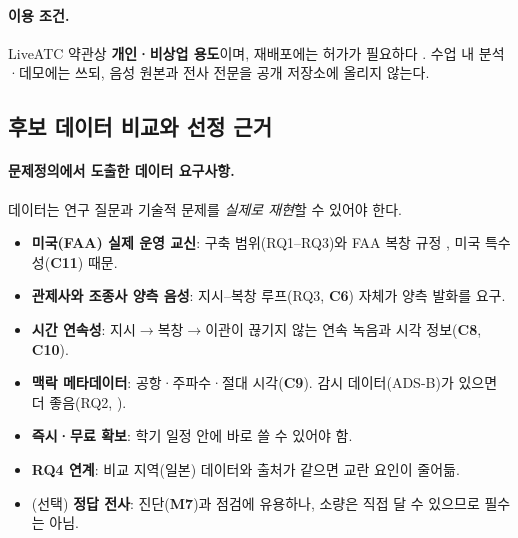 \documentclass[10pt,a4paper]{article}
\newcommand{\ch}[1]{\textbf{\textcolor{red!60!black}{#1}}}
\newcommand{\md}[1]{\textbf{\textcolor{blue!60!black}{#1}}}
\begin{document}
\paragraph{이용 조건.} LiveATC 약관상 \textbf{개인·비상업 용도}이며, 재배포에는 허가가 필요하다 \cite{hfliveatc}. 수업 내 분석·데모에는 쓰되, 음성 원본과 전사 전문을 공개 저장소에 올리지 않는다.

\subsection{후보 데이터 비교와 선정 근거}\label{sec:datacmp}
\paragraph{문제정의에서 도출한 데이터 요구사항.} 데이터는 연구 질문과 기술적 문제를 \emph{실제로 재현}할 수 있어야 한다.
\begin{itemize}
\item[\textbf{R1}] \textbf{미국(FAA) 실제 운영 교신}: 구축 범위(RQ1--RQ3)와 FAA 복창 규정 \cite{faa7110}, 미국 특수성(\ch{C11}) 때문.
\item[\textbf{R2}] \textbf{관제사와 조종사 양측 음성}: 지시--복창 루프(RQ3, \ch{C6}) 자체가 양측 발화를 요구.
\item[\textbf{R3}] \textbf{시간 연속성}: 지시$\to$복창$\to$이관이 끊기지 않는 연속 녹음과 시각 정보(\ch{C8}, \ch{C10}).
\item[\textbf{R4}] \textbf{맥락 메타데이터}: 공항·주파수·절대 시각(\ch{C9}). 감시 데이터(ADS-B)가 있으면 더 좋음(RQ2, \cite{nigmatulina2022}).
\item[\textbf{R5}] \textbf{즉시·무료 확보}: 학기 일정 안에 바로 쓸 수 있어야 함.
\item[\textbf{R6}] \textbf{RQ4 연계}: 비교 지역(일본) 데이터와 출처가 같으면 교란 요인이 줄어듦.
\item[\textbf{R7}] (선택) \textbf{정답 전사}: 진단(\md{M7})과 점검에 유용하나, 소량은 직접 달 수 있으므로 필수는 아님.
\end{itemize}
\end{document}
